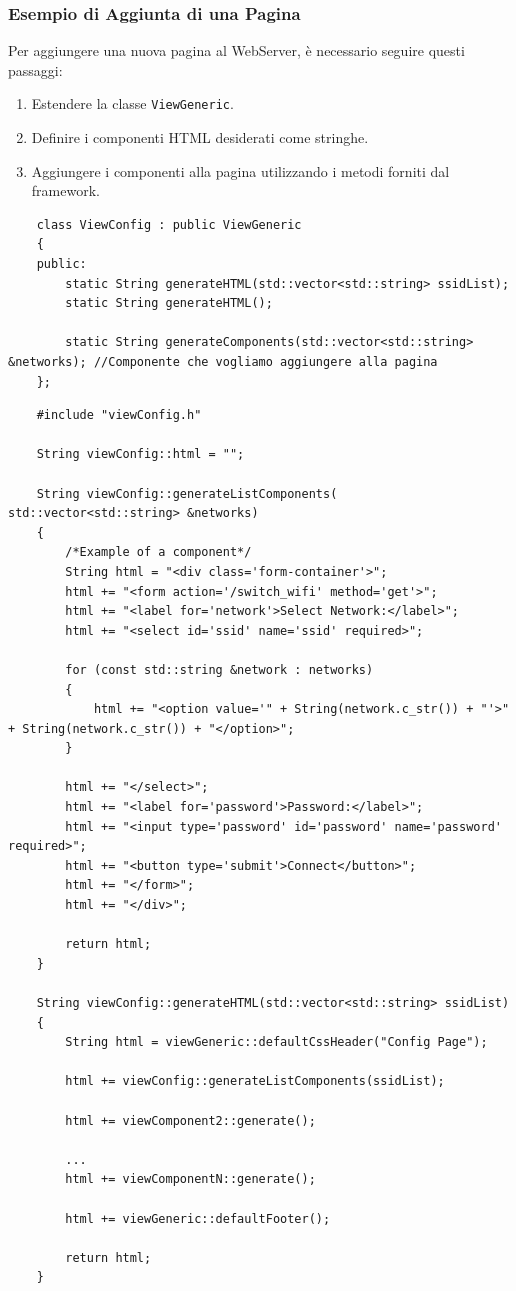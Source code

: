\documentclass[12pt,a4paper]{report}
\begin{document}
\subsubsection{Esempio di Aggiunta di una Pagina}
Per aggiungere una nuova pagina al WebServer, è necessario seguire questi passaggi:
\begin{enumerate}
    \item Estendere la classe \texttt{ViewGeneric}.
    \item Definire i componenti HTML desiderati come stringhe.
    \item Aggiungere i componenti alla pagina utilizzando i metodi forniti dal framework.
\end{enumerate}


\begin{verbatim}
    class ViewConfig : public ViewGeneric
    {
    public:
        static String generateHTML(std::vector<std::string> ssidList);
        static String generateHTML();
    
        static String generateComponents(std::vector<std::string> &networks); //Componente che vogliamo aggiungere alla pagina
    };
\end{verbatim}


\begin{verbatim}
    #include "viewConfig.h"

    String viewConfig::html = "";
    
    String viewConfig::generateListComponents( std::vector<std::string> &networks)
    {
        /*Example of a component*/
        String html = "<div class='form-container'>";
        html += "<form action='/switch_wifi' method='get'>";
        html += "<label for='network'>Select Network:</label>";
        html += "<select id='ssid' name='ssid' required>";
    
        for (const std::string &network : networks)
        {
            html += "<option value='" + String(network.c_str()) + "'>" + String(network.c_str()) + "</option>";
        }
    
        html += "</select>";
        html += "<label for='password'>Password:</label>";
        html += "<input type='password' id='password' name='password' required>";
        html += "<button type='submit'>Connect</button>";
        html += "</form>";
        html += "</div>";
    
        return html;
    }
    
    String viewConfig::generateHTML(std::vector<std::string> ssidList)
    {
        String html = viewGeneric::defaultCssHeader("Config Page");
    
        html += viewConfig::generateListComponents(ssidList);

        html += viewComponent2::generate();

        ...
        html += viewComponentN::generate();
    
        html += viewGeneric::defaultFooter();
    
        return html;
    }
    

\end{verbatim}
\end{document}
